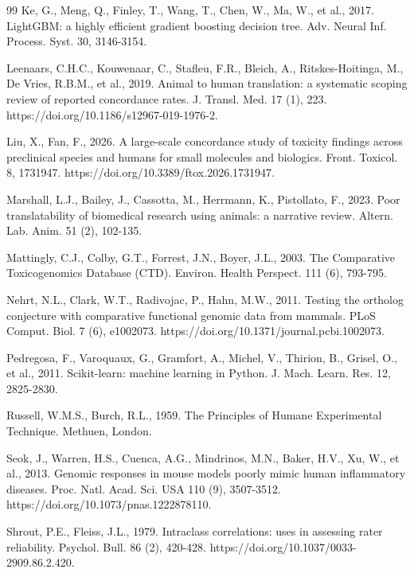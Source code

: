 \documentclass[review,12pt,authoryear]{elsarticle}
\begin{document}
\begin{thebibliography}{99}
Ke, G., Meng, Q., Finley, T., Wang, T., Chen, W., Ma, W., et al., 2017. LightGBM:
a highly efficient gradient boosting decision tree. Adv. Neural Inf. Process.
Syst. 30, 3146-3154.

Leenaars, C.H.C., Kouwenaar, C., Stafleu, F.R., Bleich, A., Ritskes-Hoitinga, M.,
De Vries, R.B.M., et al., 2019. Animal to human translation: a systematic
scoping review of reported concordance rates. J. Transl. Med. 17 (1), 223.
https://doi.org/10.1186/s12967-019-1976-2.

Liu, X., Fan, F., 2026. A large-scale concordance study of toxicity findings
across preclinical species and humans for small molecules and biologics. Front.
Toxicol. 8, 1731947. https://doi.org/10.3389/ftox.2026.1731947.

Marshall, L.J., Bailey, J., Cassotta, M., Herrmann, K., Pistollato, F., 2023.
Poor translatability of biomedical research using animals: a narrative review.
Altern. Lab. Anim. 51 (2), 102-135.

Mattingly, C.J., Colby, G.T., Forrest, J.N., Boyer, J.L., 2003. The Comparative
Toxicogenomics Database (CTD). Environ. Health Perspect. 111 (6), 793-795.

Nehrt, N.L., Clark, W.T., Radivojac, P., Hahn, M.W., 2011. Testing the ortholog
conjecture with comparative functional genomic data from mammals. PLoS Comput.
Biol. 7 (6), e1002073. https://doi.org/10.1371/journal.pcbi.1002073.

Pedregosa, F., Varoquaux, G., Gramfort, A., Michel, V., Thirion, B., Grisel, O.,
et al., 2011. Scikit-learn: machine learning in Python. J. Mach. Learn. Res. 12,
2825-2830.

Russell, W.M.S., Burch, R.L., 1959. The Principles of Humane Experimental
Technique. Methuen, London.

Seok, J., Warren, H.S., Cuenca, A.G., Mindrinos, M.N., Baker, H.V., Xu, W., et
al., 2013. Genomic responses in mouse models poorly mimic human inflammatory
diseases. Proc. Natl. Acad. Sci. USA 110 (9), 3507-3512.
https://doi.org/10.1073/pnas.1222878110.

Shrout, P.E., Fleiss, J.L., 1979. Intraclass correlations: uses in assessing
rater reliability. Psychol. Bull. 86 (2), 420-428.
https://doi.org/10.1037/0033-2909.86.2.420.


\end{thebibliography}
\end{document}

